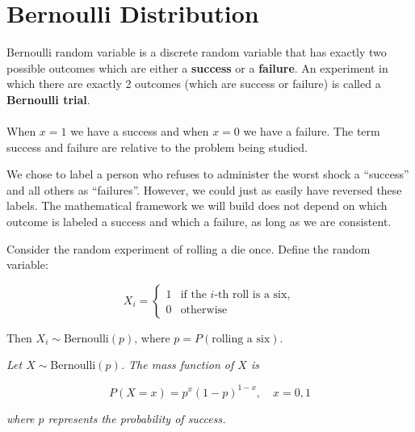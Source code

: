 \section{Bernoulli Distribution}
Bernoulli random variable is a discrete random variable that has exactly two possible outcomes which are either a \textbf{success} or a \textbf{failure}. An experiment in which there are exactly 2 outcomes (which are success or failure) is called a \textbf{Bernoulli trial}. \\
\vspace{1,0em} \\
When \( x = 1 \) we have a success and when \( x = 0 \) we have a failure. The term success and failure are relative to the problem being studied.

\begin{tcolorbox}[title=\textbf{TIP: ``success'' need not be something positive}, 
  colback=cyan!5, 
  colframe=cyan!40!black, 
  coltitle=black, 
  colbacktitle=cyan!10,
  fonttitle=\bfseries,
  sharp corners=south,
  breakable]

We chose to label a person who refuses to administer the worst shock a ``success'' and all others as ``failures''. However, we could just as easily have reversed these labels. The mathematical framework we will build does not depend on which outcome is labeled a success and which a failure, as long as we are consistent.

\end{tcolorbox}

\vspace{1,0em} 

Consider the random experiment of rolling a die once. Define the random variable:

\[
X_i =
\begin{cases}
1 & \text{if the } i\text{-th roll is a six}, \\
0 & \text{otherwise}
\end{cases}
\]

Then \( X_i \sim \text{Bernoulli}(p) \), where \( p = P(\text{rolling a six}) \). 
\begin{tcolorbox}[
  colback=yellow!10,
  colframe=yellow!10,
  boxrule=0pt,
  sharp corners=south,
  enhanced,
  breakable]

\textit{Let \( X \sim \text{Bernoulli}(p) \). The mass function of \( X \) is}

\[
P(X = x) = p^x (1 - p)^{1 - x}, \quad x = 0, 1
\]

\textit{where \( p \) represents the probability of success.}

\end{tcolorbox}




